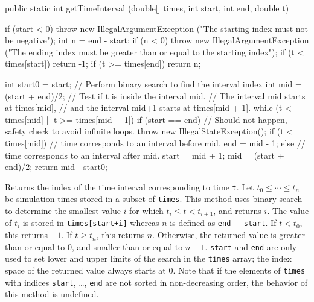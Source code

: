 \begin{code}

   public static int getTimeInterval (double[] times, int start, int end,
                                      double t)\begin{hide} {
      if (start < 0)
         throw new IllegalArgumentException
            ("The starting index must not be negative");
      int n = end - start;
      if (n < 0)
         throw new IllegalArgumentException
            ("The ending index must be greater than or equal to the starting index");
      if (t < times[start])
         return -1;
      if (t >= times[end])
         return n;

      int start0 = start;
      // Perform binary search to find the interval index
      int mid = (start + end)/2;
      // Test if t is inside the interval mid.
      // The interval mid starts at times[mid],
      // and the interval mid+1 starts at times[mid + 1].
      while (t < times[mid] || t >= times[mid + 1]) {
         if (start == end)
            // Should not happen, safety check to avoid infinite loops.
            throw new IllegalStateException();
         if (t < times[mid])
            // time corresponds to an interval before mid.
            end = mid - 1;
         else
            // time corresponds to an interval after mid.
            start = mid + 1;
         mid = (start + end)/2;
      }
      return mid - start0;
   }\end{hide}
\end{code}
\begin{tabb}   Returns the index of the time interval corresponding to time \texttt{t}.
 Let $t_0\le\cdots\le t_n$ be simulation times stored in a subset of
 \texttt{times}.  This method uses binary search to determine the
 smallest value $i$ for which $t_i\le t < t_{i+1}$, and returns $i$.
 The value of $t_i$ is stored in \texttt{times[start+i]} whereas
 $n$ is defined as \texttt{end - start}.
 If $t<t_0$, this returns $-1$.  If $t\ge t_n$, this returns $n$.
 Otherwise, the returned value is greater than or equal to 0, and
 smaller than or equal to $n-1$. \texttt{start} and \texttt{end} are only used
 to set lower and upper limits of the search in the \texttt{times}
 array; the index space of the returned value always starts at 0.
 Note that if the elements of \texttt{times} with indices \texttt{start},
 \ldots, \texttt{end} are not sorted in non-decreasing order,
 the behavior of this method is undefined.
\end{tabb}
\begin{htmlonly}
\end{htmlonly}
